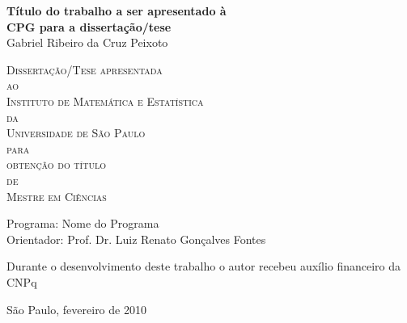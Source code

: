 \documentclass[11pt,twoside,a4paper]{book}
\begin{document}
\frontmatter 
\fancyhead[RO]{{\footnotesize\rightmark}\hspace{2em}\thepage}
\setcounter{tocdepth}{2}
\fancyhead[LE]{\thepage\hspace{2em}\footnotesize{\leftmark}}
\fancyhead[RE,LO]{}
\fancyhead[RO]{{\footnotesize\rightmark}\hspace{2em}\thepage}

\onehalfspacing  %

\thispagestyle{empty}
\begin{center}
  \vspace*{2.3cm}
  \textbf{\Large{Título do trabalho a ser apresentado à \\
      CPG para a dissertação/tese}}\\
  
  \vspace*{1.2cm}
  \Large{Gabriel Ribeiro da Cruz Peixoto}
  
  \vskip 2cm
  \textsc{
    Dissertação/Tese apresentada\\[-0.25cm] 
    ao\\[-0.25cm]
    Instituto de Matemática e Estatística\\[-0.25cm]
    da\\[-0.25cm]
    Universidade de São Paulo\\[-0.25cm]
    para\\[-0.25cm]
    obtenção do título\\[-0.25cm]
    de\\[-0.25cm]
    Mestre em Ciências}
  
  \vskip 1.5cm
  Programa: Nome do Programa\\
  Orientador: Prof. Dr. Luiz Renato Gonçalves Fontes

  \vskip 1cm
  \normalsize{Durante o desenvolvimento deste trabalho o autor recebeu auxílio
    financeiro da CNPq}
  
  \vskip 0.5cm
  \normalsize{São Paulo, fevereiro de 2010}
\end{center}

\end{document}
